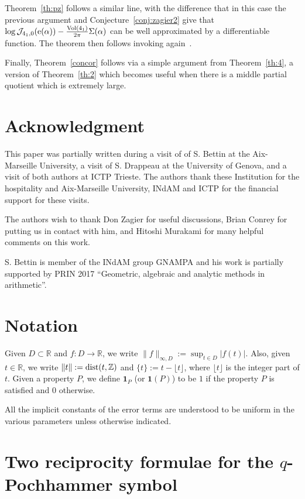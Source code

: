 \documentclass[11pt]{amsart}
\newcommand{\R}{\mathbb{R}}
\newcommand{\Z}{\mathbb{Z}}
\newcommand{\Sm}{\Sigma}
\newcommand{\J}{\mathcal{J}}
\newcommand{\tn}[1]{\textnormal{#1}}
\theoremstyle{definition}
\newcommand{\pr}[1]{\mathchoice{\left( #1\right)}{(#1)}{(#1)}{(#1)}}
\newcommand{\e}[1][]{\ifthenelse{\equal{#1}{}}{{\rm e}}{\operatorname{e}\pr{ #1}}}
\DeclareMathOperator{\Vol}{Vol}
\newcommand{\1}{{\mathbf 1}}
\let\originalleft\left
\let\originalright\right
\renewcommand{\left}{\mathopen{}\mathclose\bgroup\originalleft}
\renewcommand{\right}{\aftergroup\egroup\originalright}
\numberwithin{equation}{section}
\begin{document}
Theorem~\ref{th:pz} follows a similar line, with the difference that in this case the previous argument and Conjecture~\ref{conj:zagier2} give that $\log \J_{4_1,0}(\e[\alpha])- \frac{\Vol(4_1)}{2\pi}\Sm(\alpha)$ can be well approximated by a differentiable function. The theorem then follows invoking again~\cite{BettinDrappeau}.

Finally, Theorem~\ref{concor} follows via a simple argument from Theorem~\ref{th:4}, a version of Theorem~\ref{th:2} which becomes useful when there is a middle partial quotient which  is extremely large.



\section*{Acknowledgment}
This paper was partially written during a visit of of S. Bettin at the Aix-Marseille University, a visit of S. Drappeau at the University of Genova, and a visit of both authors at ICTP Trieste. The authors thank these Institution for the hospitality and Aix-Marseille University, INdAM and ICTP for the financial support for these visits.

The authors wish to thank Don Zagier for useful discussions, Brian Conrey for putting us in contact with him, and Hitoshi Murakami for many helpful comments on this work.

S. Bettin is member of the INdAM group GNAMPA and his work is partially supported by PRIN 2017 ``Geometric, algebraic and analytic methods in arithmetic''.


\section*{Notation}
Given $D\subset \R$ and $f:D\to\R$, we write $\|f\|_{\infty, D}:=\sup_{t\in D}|f(t)|$. Also, given $t\in\R$, we write
$\|t\|:=\tn{dist}(t,\Z)$ and $\{t\}:=t-\lfloor t\rfloor$, where $\lfloor t\rfloor$ is the integer part of $t$. Given a property $P$, we define $\1_{P}$ (or $\1(P)$) to be $1$ if the property $P$ is satisfied and $0$ otherwise. 

All the implicit constants of the error terms are understood to be uniform in the various parameters unless otherwise indicated.


\section{Two reciprocity formulae for the $q$-Pochhammer symbol}\label{repsec}
\end{document}
